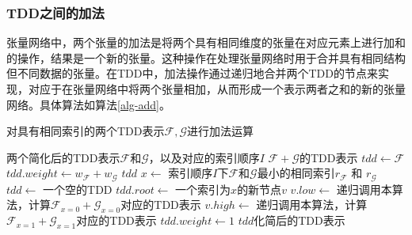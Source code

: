 \subsubsection*{TDD之间的加法}
张量网络中，两个张量的加法是将两个具有相同维度的张量在对应元素上进行加和的操作，结果是一个新的张量。这种操作在处理张量网络时用于合并具有相同结构但不同数据的张量。在TDD中，加法操作通过递归地合并两个TDD的节点来实现，对应于在张量网络中将两个张量相加，从而形成一个表示两者之和的新的张量网络。具体算法如算法\ref{alg-add}。
\begin{algorithm}
\caption{对具有相同索引的两个TDD表示\(\mathcal{F}, \mathcal{G}\)进行加法运算}
\label{alg-add}
\begin{algorithmic}[1]
\Require 两个简化后的TDD表示\(\mathcal{F}\)和\(\mathcal{G}\)，以及对应的索引顺序\(I\)
\Ensure \(\mathcal{F} + \mathcal{G}\)的TDD表示
    \State \(tdd \gets \mathcal{F}\)
    \State \(tdd.weight \gets w_{\mathcal{F}} + w_{\mathcal{G}}\)
    \State \Return \(tdd\)
\EndIf
\State \(x \gets\) 索引顺序\(I\)下\(\mathcal{F}\)和\(\mathcal{G}\)最小的相同索引\(r_{\mathcal{F}}\) 和 \(r_{\mathcal{G}}\)
\State \(tdd \gets\) 一个空的TDD
\State \(tdd.root \gets\) 一个索引为\(x\)的新节点\(v\)
\State \(v.low \gets\) 递归调用本算法，计算\(\mathcal{F}_{x=0} + \mathcal{G}_{x=0}\)对应的TDD表示
\State \(v.high \gets\) 递归调用本算法，计算\(\mathcal{F}_{x=1} + \mathcal{G}_{x=1}\)对应的TDD表示
\State \(tdd.weight \gets 1\)
\State \Return \(tdd\)化简后的TDD表示
\end{algorithmic}
\end{algorithm}

